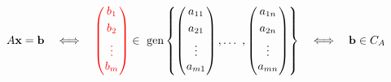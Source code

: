 {\begin{frame}
\begin{columns}[c]
\begin{column}{1.15\textwidth}
\vspace{2mm}
\[
A\mathbf{x} = \mathbf{b} 
\quad \Longleftrightarrow \quad 
{\color{red}
\left(
\begin{array}{@{\hspace{0.1\tabcolsep}}c@{\hspace{0.1\tabcolsep}}}
b_{1} \\[1mm]
b_{2} \\[1mm]
\vdots \\[0mm]
b_{m} \\[1mm]
\end{array}
\right)
}
\in 
\text{ gen}
\left\{
\left(
\begin{array}{@{\hspace{0.1\tabcolsep}}c@{\hspace{0.1\tabcolsep}}}
a_{11} \\[1mm]
a_{21} \\[1mm]
\vdots \\[0mm]
a_{m1} \\[1mm]
\end{array}
\right)%
,
\hdots\ 
,
\left(
\begin{array}{@{\hspace{0.1\tabcolsep}}c@{\hspace{0.1\tabcolsep}}}
a_{1n} \\[1mm]
a_{2n} \\[1mm]
\vdots \\[0mm]
a_{mn} \\[1mm]
\end{array}
\right)
\right\}
\quad \Longleftrightarrow \quad 
\mathbf{b} \in C_A
\]

\end{column}
\end{columns}


\end{frame}}

